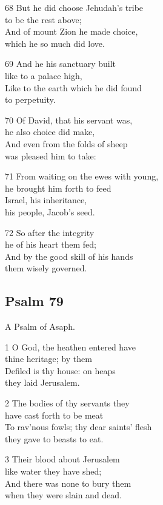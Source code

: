 68 But he did choose Jehudah’s tribe\\
to be the rest above;\\
And of mount Zion he made choice,\\
which he so much did love.

69 And he his sanctuary built\\
like to a palace high,\\
Like to the earth which he did found\\
to perpetuity.

70 Of David, that his servant was,\\
he also choice did make,\\
And even from the folds of sheep\\
was pleased him to take:

71 From waiting on the ewes with young,\\
he brought him forth to feed\\
Israel, his inheritance,\\
his people, Jacob’s seed.

72 So after the integrity\\
he of his heart them fed;\\
And by the good skill of his hands\\
them wisely governed.


\begin{center}
\quad{}\quad{}
\end{center}

\subsection*{Psalm 79}

A Psalm of Asaph.

1 O God, the heathen entered have\\
thine heritage; by them\\
Defiled is thy house: on heaps\\
they laid Jerusalem.

2 The bodies of thy servants they\\
have cast forth to be meat\\
To rav’nous fowls; thy dear saints’ flesh\\
they gave to beasts to eat.

3 Their blood about Jerusalem\\
like water they have shed;\\
And there was none to bury them\\
when they were slain and dead.

